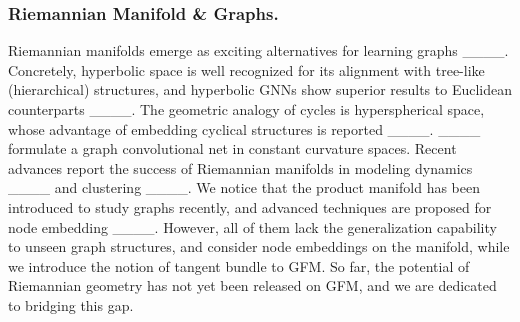   \vspace{-0.05in}
\subsubsection*{\textbf{Riemannian Manifold \& Graphs.}}
Riemannian manifolds emerge as exciting alternatives for learning graphs ____.
Concretely, hyperbolic space is well recognized for its alignment with tree-like (hierarchical) structures,
and hyperbolic GNNs show superior results to Euclidean counterparts ____. 
The geometric analogy of cycles is hyperspherical space, whose advantage of embedding cyclical structures is reported ____. 
____ formulate a graph convolutional net in constant curvature spaces.
Recent advances report the success of Riemannian manifolds in modeling dynamics  ____ and clustering ____.
We notice that the product manifold has been introduced to study graphs recently, 
and advanced techniques are proposed for node embedding ____.
However, all of them lack the generalization capability to unseen graph structures, and consider node embeddings on the manifold, while we introduce the notion of tangent bundle to GFM.
So far, the potential of Riemannian geometry has not yet been released on GFM, and we are dedicated to bridging this gap.

  \vspace{-0.1in}